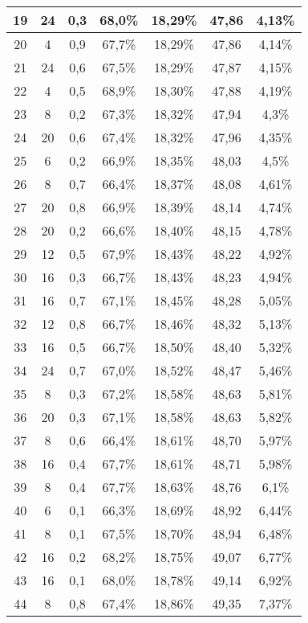 \begin{longtable}{|c|c|c|c|c|c|c|}
19 & 24 & 0,3 &  68,0\% & 18,29\% & 47,86 & 4,13\% \\ \hline
20 & 4 & 0,9 &  67,7\% & 18,29\% & 47,86 & 4,14\% \\ \hline
21 & 24 & 0,6 &  67,5\% & 18,29\% & 47,87 & 4,15\% \\ \hline
22 & 4 & 0,5 &  68,9\% & 18,30\% & 47,88 & 4,19\% \\ \hline
23 & 8 & 0,2 &  67,3\% & 18,32\% & 47,94 & 4,3\% \\ \hline
24 & 20 & 0,6 &  67,4\% & 18,32\% & 47,96 & 4,35\% \\ \hline
25 & 6 & 0,2 &  66,9\% & 18,35\% & 48,03 & 4,5\% \\ \hline
26 & 8 & 0,7 &  66,4\% & 18,37\% & 48,08 & 4,61\% \\ \hline
27 & 20 & 0,8 &  66,9\% & 18,39\% & 48,14 & 4,74\% \\ \hline
28 & 20 & 0,2 &  66,6\% & 18,40\% & 48,15 & 4,78\% \\ \hline
29 & 12 & 0,5 &  67,9\% & 18,43\% & 48,22 & 4,92\% \\ \hline
30 & 16 & 0,3 &  66,7\% & 18,43\% & 48,23 & 4,94\% \\ \hline
31 & 16 & 0,7 &  67,1\% & 18,45\% & 48,28 & 5,05\% \\ \hline
32 & 12 & 0,8 &  66,7\% & 18,46\% & 48,32 & 5,13\% \\ \hline
33 & 16 & 0,5 &  66,7\% & 18,50\% & 48,40 & 5,32\% \\ \hline
34 & 24 & 0,7 &  67,0\% & 18,52\% & 48,47 & 5,46\% \\ \hline
35 & 8 & 0,3 &  67,2\% & 18,58\% & 48,63 & 5,81\% \\ \hline
36 & 20 & 0,3 &  67,1\% & 18,58\% & 48,63 & 5,82\% \\ \hline
37 & 8 & 0,6 &  66,4\% & 18,61\% & 48,70 & 5,97\% \\ \hline
38 & 16 & 0,4 &  67,7\% & 18,61\% & 48,71 & 5,98\% \\ \hline
39 & 8 & 0,4 &  67,7\% & 18,63\% & 48,76 & 6,1\% \\ \hline
40 & 6 & 0,1 &  66,3\% & 18,69\% & 48,92 & 6,44\% \\ \hline
41 & 8 & 0,1 &  67,5\% & 18,70\% & 48,94 & 6,48\% \\ \hline
42 & 16 & 0,2 &  68,2\% & 18,75\% & 49,07 & 6,77\% \\ \hline
43 & 16 & 0,1 &  68,0\% & 18,78\% & 49,14 & 6,92\% \\ \hline
44 & 8 & 0,8 &  67,4\% & 18,86\% & 49,35 & 7,37\% \\ \hline

\end{longtable}
